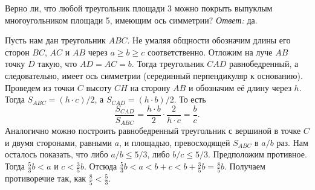 \problem
Верно ли, что любой треугольник площади 3 можно покрыть выпуклым
многоугольником площади 5, имеющим ось симметрии?
\solution
\emph{Ответ:} да.
\par
Пусть нам дан треугольник $ABC$.
Не умаляя общности обозначим длины его сторон $BC$, $AC$ и $AB$ через
$a \geq b \geq c$ соответственно.
Отложим на луче $AB$ точку $D$ такую, что $AD = AC = b$.
Тогда треугольник $CAD$ равнобедренный, а следовательно, имеет ось симметрии
(серединный перпендикуляр к основанию).
Проведем из точки $C$ высоту $CH$ на сторону $AB$ и обозначим её длину через
$h$.
Тогда $S_{ABC} = (h \cdot c) / 2$, а $S_{CAD} = (h \cdot b) / 2$.
То есть
\[
    \dfrac{S_{CAD}}{S_{ABC}}
=
    \dfrac{h \cdot b}{2} \cdot \dfrac{2}{h \cdot c}
=
    \dfrac{b}{c}
.\]
Аналогично можно построить равнобедренный треугольник с вершиной в точке $C$ и
двумя сторонами, равными $a$, и площадью, превосходящей $S_{ABC}$ в
$a / b$ раз.
Нам осталось показать, что либо $a / b \leq 5 / 3$, либо
$b / c \leq 5 / 3$.
Предположим противное.
Тогда $\frac{5}{3} b < a$ и $c < \frac{3}{5} b$.
Отсюда $\frac{5}{3} b < a < b + c < b + \frac{3}{5} b = \frac{8}{5} b$.
Получаем противоречие так, как $\frac{8}{5} < \frac{5}{3}$.
\endproblem
